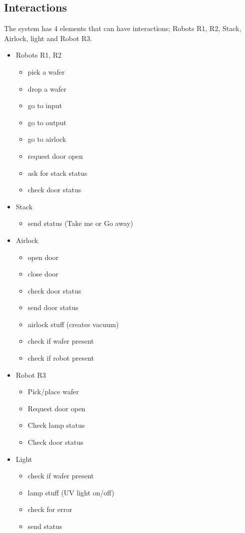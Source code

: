 \documentclass[twocolumn]{article}
\begin{document}
\subsection{Interactions}
The system has 4 elements that can have interactions; Robots R1, R2, Stack, Airlock, light and Robot R3.
\begin{itemize}
\item Robots R1, R2
\begin{itemize}
\item{pick a wafer}
\item{drop a wafer}
\item{go to input}
\item{go to output}
\item{go to airlock}
\item{request door open}
\item{ask for stack status}
\item{check door status}
\end{itemize}
\item Stack
\begin{itemize}
\item{ send status (Take me or Go away) }
\end{itemize}
\item Airlock
\begin{itemize}
\item{ open door}
\item{ close door}
\item{ check door status}
\item{ send door status}
\item{ airlock stuff (creates vacuum)}
\item{check if wafer present}
\item check if robot present
\end{itemize}
\item Robot R3
\begin{itemize}
\item{Pick/place wafer }
\item{Request door open}
\item{Check lamp status}
\item{ Check door status}
\end{itemize}
\end{itemize}
\begin{itemize}
 
\item Light
\begin{itemize}
 \item check if wafer present
\item lamp stuff (UV light on/off)
\item check for error
\item send status
\end{itemize}
\end{itemize}
\end{document}
